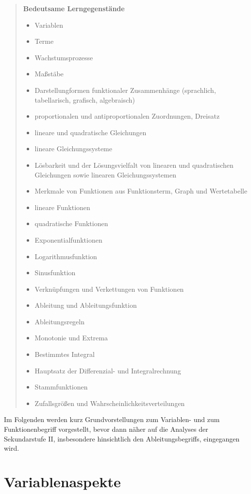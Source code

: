 \documentclass[
]{scrbook}
\providecommand{\tightlist}{%
  \setlength{\itemsep}{0pt}\setlength{\parskip}{0pt}}
\theoremstyle{definition}
\theoremstyle{definition}
\theoremstyle{definition}
\theoremstyle{definition}
\theoremstyle{remark}
\begin{document}
\begin{quote}
\textbf{Bedeutsame Lerngegenstände}

\begin{itemize}
\tightlist
\item
  Variablen
\item
  Terme
\item
  Wachstumsprozesse
\item
  Maßstäbe
\item
  Darstellungformen funktionaler Zusammenhänge (sprachlich, tabellarisch, grafisch, algebraisch)
\item
  proportionalen und antiproportionalen Zuordnungen, Dreisatz
\item
  lineare und quadratische Gleichungen
\item
  lineare Gleichungssysteme
\item
  Lösbarkeit und der Lösungsvielfalt von linearen und quadratischen Gleichungen sowie linearen Gleichungssystemen
\item
  Merkmale von Funktionen aus Funktionsterm, Graph und Wertetabelle
\item
  lineare Funktionen
\item
  quadratische Funktionen
\item
  Exponentialfunktionen
\item
  Logarithmusfunktion
\item
  Sinusfunktion
\item
  Verknüpfungen und Verkettungen von Funktionen
\item
  Ableitung und Ableitungsfunktion
\item
  Ableitungsregeln
\item
  Monotonie und Extrema
\item
  Bestimmtes Integral
\item
  Hauptsatz der Differenzial- und Integralrechnung
\item
  Stammfunktionen
\item
  Zufallsgrößen und Wahrscheinlichkeitsverteilungen
\end{itemize}
\end{quote}

Im Folgenden werden kurz Grundvorstellungen zum Variablen- und zum Funktionenbegriff vorgestellt, bevor dann näher auf die Analyses der Sekundarstufe II, insbesondere hinsichtlich den Ableitungsbegriffs, eingegangen wird.

\hypertarget{variablenaspekte}{%
\section{Variablenaspekte}\label{variablenaspekte}}
\end{document}
